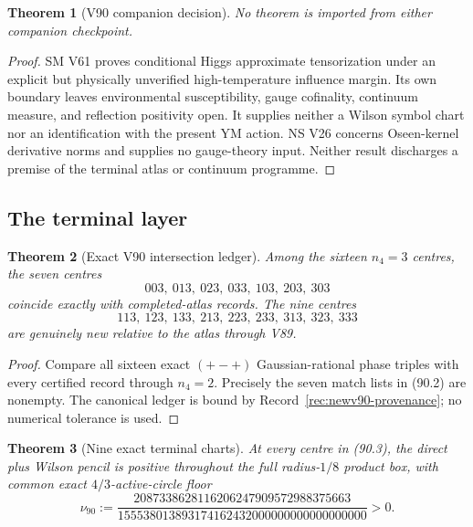 \documentclass[11pt,oneside]{article}
\newtheorem{theorem}{Theorem}[section]
\theoremstyle{definition}
\theoremstyle{remark}
\begin{document}
\begin{theorem}[V90 companion decision]
\label{thm:newv90-audit-decision}
No theorem is imported from either companion checkpoint.
\end{theorem}

\begin{proof}
SM V61 proves conditional Higgs approximate tensorization under an
explicit but physically unverified high-temperature influence
margin.  Its own boundary leaves environmental susceptibility,
gauge cofinality, continuum measure, and reflection positivity open.
It supplies neither a Wilson symbol chart nor an identification with
the present YM action.  NS V26 concerns Oseen-kernel derivative
norms and supplies no gauge-theory input.  Neither result discharges
a premise of the terminal atlas or continuum programme.
\end{proof}

\subsection{The terminal layer}

\begin{theorem}[Exact V90 intersection ledger]
\label{thm:newv90-intersection}
Among the sixteen \(n_4=3\) centres, the seven centres
\[
 003,\ 013,\ 023,\ 033,\ 103,\ 203,\ 303             \tag{90.2}
\]
coincide exactly with completed-atlas records.  The nine centres
\[
 113,\ 123,\ 133,\ 213,\ 223,\ 233,\ 313,\ 323,\ 333 \tag{90.3}
\]
are genuinely new relative to the atlas through V89.
\end{theorem}

\begin{proof}
Compare all sixteen exact \((+-+)\) Gaussian-rational phase triples
with every certified record through \(n_4=2\).  Precisely the seven
match lists in (90.2) are nonempty.  The canonical ledger is bound
by Record~\ref{rec:newv90-provenance}; no numerical tolerance is
used.
\end{proof}

\begin{theorem}[Nine exact terminal charts]
\label{thm:newv90-nine-charts}
At every centre in (90.3), the direct plus Wilson pencil is positive
throughout the full radius-\(1/8\) product box, with common exact
\(4/3\)-active-circle floor
\[
\nu_{90}:=
\frac{2087338628116206247909572988375663}
     {155538013893174162432000000000000000000}>0.     \tag{90.4}
\]
\end{theorem}
\end{document}

